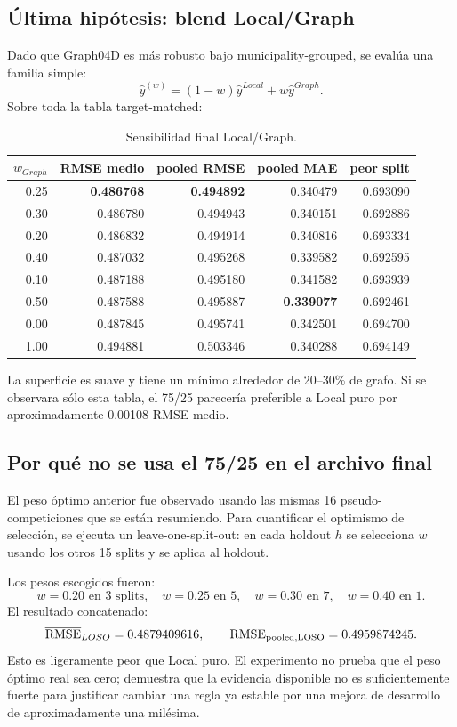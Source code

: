 \subsection{Última hipótesis: blend Local/Graph}

Dado que Graph04D es más robusto bajo municipality-grouped, se evalúa una familia simple:
\[
\hat y^{(w)}
=
(1-w)\hat y^{Local}
+
w\hat y^{Graph}.
\]
Sobre toda la tabla target-matched:
\begin{table}[H]
\centering
\caption{Sensibilidad final Local/Graph.}
\label{tab:cp04f-blends}
\begin{tabular}{rrrrr}
\toprule
$w_{Graph}$ & RMSE medio & pooled RMSE & pooled MAE & peor split \\
\midrule
0.25 & \textbf{0.486768} & \textbf{0.494892} & 0.340479 & 0.693090 \\
0.30 & 0.486780 & 0.494943 & 0.340151 & 0.692886 \\
0.20 & 0.486832 & 0.494914 & 0.340816 & 0.693334 \\
0.40 & 0.487032 & 0.495268 & 0.339582 & 0.692595 \\
0.10 & 0.487188 & 0.495180 & 0.341582 & 0.693939 \\
0.50 & 0.487588 & 0.495887 & \textbf{0.339077} & 0.692461 \\
0.00 & 0.487845 & 0.495741 & 0.342501 & 0.694700 \\
1.00 & 0.494881 & 0.503346 & 0.340288 & 0.694149 \\
\bottomrule
\end{tabular}
\end{table}

La superficie es suave y tiene un mínimo alrededor de 20--30\% de grafo. Si se observara sólo
esta tabla, el 75/25 parecería preferible a Local puro por aproximadamente 0.00108 RMSE medio.

\subsection{Por qué no se usa el 75/25 en el archivo final}

El peso óptimo anterior fue observado usando las mismas 16 pseudo-competiciones que se están
resumiendo. Para cuantificar el optimismo de selección, se ejecuta un leave-one-split-out:
en cada holdout $h$ se selecciona $w$ usando los otros 15 splits y se aplica al holdout.

Los pesos escogidos fueron:
\[
w=0.20\text{ en 3 splits},\quad
w=0.25\text{ en 5},\quad
w=0.30\text{ en 7},\quad
w=0.40\text{ en 1}.
\]
El resultado concatenado:
\[
\overline{\operatorname{RMSE}}_{LOSO}=0.4879409616,
\qquad
\operatorname{RMSE}_{\mathrm{pooled,LOSO}}=0.4959874245.
\]
Esto es ligeramente peor que Local puro. El experimento no prueba que el peso óptimo real sea
cero; demuestra que la evidencia disponible no es suficientemente fuerte para justificar
cambiar una regla ya estable por una mejora de desarrollo de aproximadamente una milésima.

